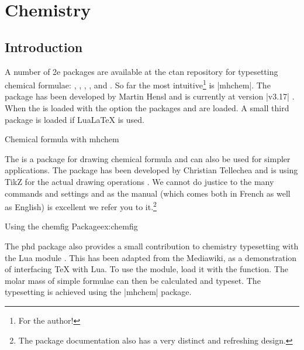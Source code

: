 \chapter{Chemistry}

\section{Introduction}

A number of \latex2e packages are available at the ctan repository for typesetting chemical formulae: , , ,  \cite{xymtex},  and  . So far the most intuitive\footnote{For the author!} is |mhchem|. The package has been developed by Martin Hensl and is currently at version |v3.17| \cite{mhchem}. When the  is loaded with the option  the packages  and  are loaded. A small third package is loaded if LuaLaTeX is used. 

\begin{texexample}{Chemical formula with mhchem}{}
\end{texexample}

The  is a package for drawing chemical formula and can also be used for simpler applications. The package has been developed by Christian Tellechea and is using TikZ for the actual drawing operations \cite{chemfig}. We cannot do justice to the many commands and settings and as the manual (which comes both in French as well as English) is excellent we refer you to it.\footnote{The package documentation also has a very distinct and refreshing design.}

\begin{texexample}{Using the chemfig Package}{ex:chemfig}
\end{texexample}

The phd package also provides a small contribution to chemistry typesetting with the Lua module . This has been adapted from the Mediawiki, as a demonstration of interfacing TeX with Lua. To use the module, load it with the  function. The molar mass of simple formulae can then be calculated and typeset. The typesetting is achieved using the |mhchem| package.

